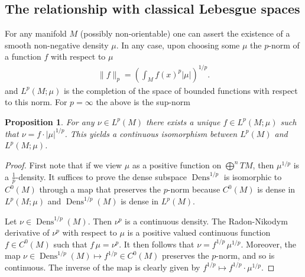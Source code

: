\documentclass[12pt]{amsart}
\newtheorem{prop}[thm]{Proposition}
\DeclareMathOperator{\Dens}{Dens}
\begin{document}
\subsection{The relationship with classical Lebesgue spaces}
\label{sec:classical_Lebesgue}
For any manifold $M$ (possibly non-orientable) one can assert the existence of a smooth non-negative density $\mu$.
In any case, upon choosing some $\mu$ the $p$-norm of a function $f$ with respect to $\mu$
\begin{align*}
	\| f \|_p =  \left( \int_M f(x)^p |\mu| \right)^{1/p}.
\end{align*}
and $L^p(M ; \mu)$ is the completion of the space of bounded functions with respect to this norm.
For $p = \infty$ the above is the sup-norm

\begin{prop}
	For any $\nu \in L^p(M)$ there exists a unique $f \in L^p(M ; \mu)$ such that $\nu = f \cdot |\mu|^{1/p}$.
	This yields a continuous isomorphism between $L^p(M)$ and $L^p(M ; \mu)$.
\end{prop}
\begin{proof}
	First note that if we view $\mu$ as a positive function on $\bigoplus^n TM$, then $\mu^{1/p}$ is a $\frac{1}{p}$-density.
	It suffices to prove the dense subspace $\Dens^{1/p}$ is isomorphic to $C^0(M)$ through a map that preserves the $p$-norm
	because $C^0(M)$ is dense in $L^p(M ; \mu)$ and $\Dens^{1/p}(M)$ is dense in $L^p(M)$.
	
	Let $\nu \in \Dens^{1/p}(M)$.  Then $\nu^p$ is a continuous density.
	The Radon-Nikodym derivative of $\nu^p$ with respect to $\mu$ is a positive valued continuous function $f \in C^0(M)$ such that $f \, \mu = \nu^p$.
	It then follows that $\nu = f^{1/p} \, \mu^{1/p}$.
	Moreover, the map $\nu \in \Dens^{1/p}(M) \mapsto f^{1/p} \in C^0(M)$ preserves the $p$-norm, and so is continuous.
	The inverse of the map is clearly given by $f^{1/p} \mapsto f^{1/p} \cdot \mu^{1/p}$.
\end{proof}
\end{document}

